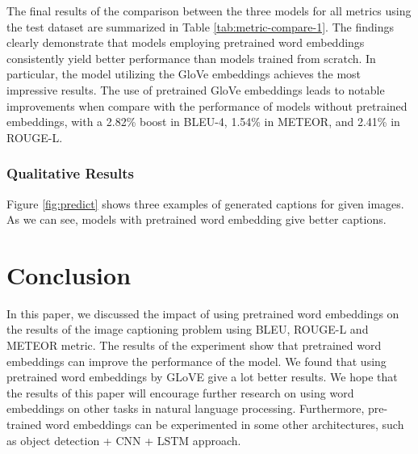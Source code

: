 \documentclass[conference]{IEEEtran}
\begin{document}
The final results of the comparison between the three models for all metrics using the test dataset are summarized in Table \ref{tab:metric-compare-1}. The findings clearly demonstrate that models employing pretrained word embeddings consistently yield better performance than models trained from scratch. In particular, the model utilizing the GloVe embeddings achieves the most impressive results. The use of pretrained GloVe embeddings leads to notable improvements when compare with the performance of models without pretrained embeddings, with a 2.82\% boost in BLEU-4, 1.54\% in METEOR, and 2.41\% in ROUGE-L.


\subsubsection{Qualitative Results}\hfill


Figure \ref{fig:predict} shows three examples of generated captions for given images. As we can see, models with pretrained word embedding give better captions.




\section{Conclusion}
In this paper, we discussed the impact of using pretrained word embeddings on the results of the image captioning problem using BLEU, ROUGE-L and METEOR metric. The results of the experiment show that pretrained word embeddings can improve the performance of the model. We found that using pretrained word embeddings by GLoVE give a lot better results. We hope that the results of this paper will encourage further research on using word embeddings on other tasks in natural language processing. Furthermore, pre-trained word embeddings can be experimented in some other architectures, such as object detection + CNN + LSTM approach\cite{DBLP:journals/corr/YangZRH17}.


\renewcommand{\refname}{References}


\end{document}
